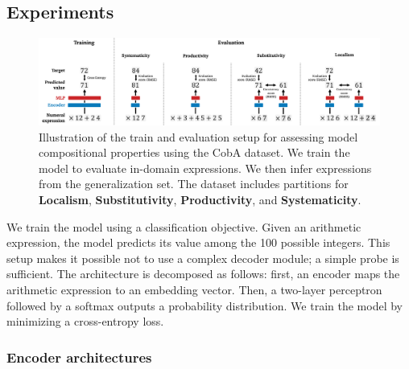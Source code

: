\subsection{Experiments}

\begin{figure}[htb!]
    \centering
    \includegraphics[width=16cm]{images/compositional_tasks_5.png}
    \caption{Illustration of the train and evaluation setup for assessing model compositional properties using the CobA dataset. We train the model to evaluate in-domain expressions. We then infer expressions from the generalization set. The dataset includes partitions for \textbf{Localism}, \textbf{Substitutivity}, \textbf{Productivity}, and \textbf{Systematicity}.}
    \label{fig:illustration}
\end{figure}


We train the model using a classification objective. Given an arithmetic expression, the model predicts its value among the 100 possible integers. This setup makes it possible not to use a complex decoder module; a simple probe is sufficient. The architecture is decomposed as follows: first, an encoder maps the arithmetic expression to an embedding vector. Then, a two-layer perceptron followed by a softmax outputs a probability distribution. We train the model by minimizing a cross-entropy loss.

\subsubsection{Encoder architectures}

